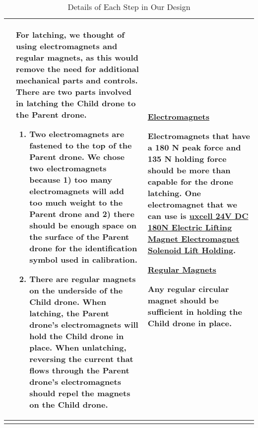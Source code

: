 \documentclass[paper=a4, fontsize=12pt]{scrartcl}
\begin{document}
\begin{longtable} { |p{}|p{}|p{}| }
	&
	For latching, we thought of using electromagnets and regular magnets, as this would remove the need for additional mechanical parts and controls.
	There are two parts involved in latching the Child drone to the Parent drone.
	\begin{enumerate}
		\item Two electromagnets are fastened to the top of the Parent drone. We chose two electromagnets because 1) too many electromagnets will add too much weight to the Parent drone and 2) there should be enough space on the surface of the Parent drone for the identification symbol used in calibration. 
		\item There are regular magnets on the underside of the Child drone. When latching, the Parent drone's electromagnets will hold the Child drone in place. When unlatching, reversing the current that flows through the Parent drone's electromagnets should repel the magnets on the Child drone. 
	\end{enumerate}
	& 
	\underline{Electromagnets}\par 
	Electromagnets that have a 180 \si{\newton} peak force and 135 \si{\newton} holding force should be more than capable for the drone latching. One electromagnet that we can use is \href{https://www.amazon.com/uxcell-Electric-Lifting-Electromagnet-Solenoid/dp/B01MUA0ZLE}{uxcell 24V DC 180N Electric Lifting Magnet Electromagnet Solenoid Lift Holding}.\par\hfill\par
	\underline{Regular Magnets}\par
	Any regular circular magnet should be sufficient in holding the Child drone in place.\\
	\hline
	\caption{Details of Each Step in Our Design}
	\label{table:steps}
\end{longtable}





\end{document}
